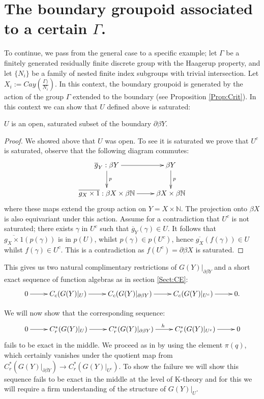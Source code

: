 \section{The boundary groupoid associated to a certain $\Gamma$.}

To continue, we pass from the general case to a specific example; let $\Gamma$ be a finitely generated residually finite discrete group with the Haagerup property, and let $\lbrace N_{i}\rbrace$ be a family of nested finite index subgroups with trivial intersection. Let $X_{i}:=Cay(\frac{\Gamma)}{N_{i}})$. In this context, the boundary groupoid is generated by the action of the group $\Gamma$ extended to the boundary (see Proposition \ref{Prop:Crit}). In this context we can show that $U$ defined above is saturated:

\begin{lemma}
$U$ is an open, saturated subset of the boundary $\partial\beta Y$. 
\end{lemma}
\begin{proof}
We showed above that $U$ was open. To see it is saturated we prove that $U^{c}$ is saturated, observe that the following diagram commutes:
\begin{equation*}
\xymatrix{
\overline{g}_{Y}:\beta Y\ar[r]\ar[d]^{p} & \beta Y\ar[d]^{p}\\
\overline{g_{X} \times 1}:  \beta X \times \beta \mathbb{N} \ar[r] & \beta X \times \beta \mathbb{N}
}
\end{equation*}
where these maps extend the group action on $Y=X \times \mathbb{N}$. The projection onto $\beta X$ is also equivariant under this action. Assume for a contradiction that $U^{c}$ is not saturated; there exists $\gamma$ in $U^{c}$ such that $\overline{g}_{Y}(\gamma) \in U$. It follows that $\overline{g_{X} \times 1}(p(\gamma))$ is in $p(U)$, whilst $p(\gamma) \in p(U^{c})$, hence $\overline{g_{X}}(f(\gamma))\in U$ whilst $f(\gamma) \in U^{c}$. This is a contradiction as $f(U^{c}) = \partial\beta X$ is saturated.
\end{proof}

This gives us two natural complimentary restrictions of $G(Y)|_{\partial\beta Y}$ and a short exact sequence of function algebras as in section \ref{Sect:CE}:
\begin{equation*}
\xymatrix{
0 \ar[r] & C_{c}(G(Y)|_{U}) \ar[r]& C_{c}(G(Y)|_{\partial\beta Y}) \ar[r] & C_{c}(G(Y)|_{U^{c}}) \ar[r] & 0.
}
\end{equation*}

We will now show that the corresponding sequence:
\begin{equation*}
\xymatrix{
0 \ar[r] & C^{*}_{r}(G(Y)|_{U}) \ar[r]& C_{r}^{*}(G(Y)|_{\partial\beta Y}) \ar[r]^{h} & C_{r}^{*}(G(Y)|_{U^{c}}) \ar[r] & 0
}
\end{equation*}
fails to be exact in the middle. We proceed as in \cite{explg1,MR1911663} by using the element $\pi(q)$, which certainly vanishes under the quotient map from $C^{*}_{r}(G(Y)|_{\partial\beta Y}) \rightarrow C^{*}_{r}(G(Y)|_{U^{c}})$. To show the failure we will show this sequence fails to be exact in the middle at the level of K-theory and for this we will require a firm understanding of the structure of $G(Y)|_{U}$.

